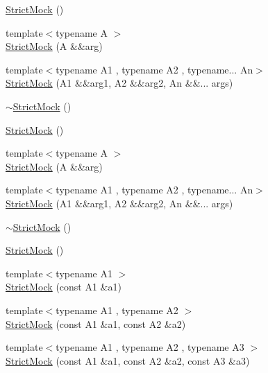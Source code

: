 \begin{DoxyCompactItemize}
\item 
\mbox{\hyperlink{classtesting_1_1_strict_mock_ad609d745db75306dd3b360b5410923fe}{Strict\+Mock}} ()
\item 
{\footnotesize template$<$typename A $>$ }\\\mbox{\hyperlink{classtesting_1_1_strict_mock_a868b6082e86b1961328f06421aab455f}{Strict\+Mock}} (A \&\&arg)
\item 
{\footnotesize template$<$typename A1 , typename A2 , typename... An$>$ }\\\mbox{\hyperlink{classtesting_1_1_strict_mock_aec319a31bdd194d1ff9596a810cb9067}{Strict\+Mock}} (A1 \&\&arg1, A2 \&\&arg2, An \&\&... args)
\item 
\mbox{\hyperlink{classtesting_1_1_strict_mock_a1c7ec10ea86747bb23037380a7353bd1}{$\sim$\+Strict\+Mock}} ()
\item 
\mbox{\hyperlink{classtesting_1_1_strict_mock_ad609d745db75306dd3b360b5410923fe}{Strict\+Mock}} ()
\item 
{\footnotesize template$<$typename A $>$ }\\\mbox{\hyperlink{classtesting_1_1_strict_mock_a868b6082e86b1961328f06421aab455f}{Strict\+Mock}} (A \&\&arg)
\item 
{\footnotesize template$<$typename A1 , typename A2 , typename... An$>$ }\\\mbox{\hyperlink{classtesting_1_1_strict_mock_aec319a31bdd194d1ff9596a810cb9067}{Strict\+Mock}} (A1 \&\&arg1, A2 \&\&arg2, An \&\&... args)
\item 
\mbox{\hyperlink{classtesting_1_1_strict_mock_a1c7ec10ea86747bb23037380a7353bd1}{$\sim$\+Strict\+Mock}} ()
\item 
\mbox{\hyperlink{classtesting_1_1_strict_mock_ad609d745db75306dd3b360b5410923fe}{Strict\+Mock}} ()
\item 
{\footnotesize template$<$typename A1 $>$ }\\\mbox{\hyperlink{classtesting_1_1_strict_mock_a42db27ba0af29804db8589676817aff8}{Strict\+Mock}} (const A1 \&a1)
\item 
{\footnotesize template$<$typename A1 , typename A2 $>$ }\\\mbox{\hyperlink{classtesting_1_1_strict_mock_a345933f3f1a10de381a508f93e680c6b}{Strict\+Mock}} (const A1 \&a1, const A2 \&a2)
\item 
{\footnotesize template$<$typename A1 , typename A2 , typename A3 $>$ }\\\mbox{\hyperlink{classtesting_1_1_strict_mock_acc25729cd85a3a412106863894a30fe7}{Strict\+Mock}} (const A1 \&a1, const A2 \&a2, const A3 \&a3)

\end{DoxyCompactItemize}
